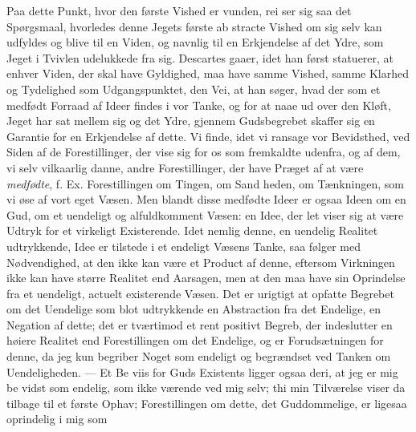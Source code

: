 \documentclass[12pt,a4paper]{book}
\begin{document}
Paa dette Punkt, hvor den første Vished er vunden, rei\-%
ser sig saa det Spørgsmaal, hvorledes denne Jegets første ab\-%
stracte Vished om sig selv kan udfyldes og blive til en Viden,
og navnlig til en Erkjendelse af det Ydre, som Jeget i Tvivlen
udelukkede fra sig. Descartes gaaer, idet han først statuerer,
at enhver Viden, der skal have Gyldighed, maa have samme
Vished, samme Klarhed og Tydelighed som Udgangspunktet,
den Vei, at han søger, hvad der som et medfødt Forraad af
Ideer findes i vor Tanke, og for at naae ud over den Kløft,
Jeget har sat mellem sig og det Ydre, gjennem Gudsbegrebet
skaffer sig en Garantie for en Erkjendelse af dette. Vi finde,
idet vi ransage vor Bevidsthed, ved Siden af de Forestillinger,
der vise sig for os som fremkaldte udenfra, og af dem, vi selv
vilkaarlig danne, andre Forestillinger, der have Præget af at
være \emph{medfødte}, f. Ex. Forestillingen om Tingen, om Sand\-%
heden, om Tænkningen, som vi øse af vort eget Væsen. Men
blandt disse medfødte Ideer er ogsaa Ideen om en Gud, om
et uendeligt og alfuldkomment Væsen: en Idee, der let viser
sig at være Udtryk for et virkeligt Existerende. Idet nemlig
denne, en uendelig Realitet udtrykkende, Idee er tilstede i et
endeligt Væsens Tanke, saa følger med Nødvendighed, at den
ikke kan være et Product af denne, eftersom Virkningen ikke
kan have større Realitet end Aarsagen, men at den maa have
sin Oprindelse fra et uendeligt, actuelt existerende Væsen.
Det er urigtigt at opfatte Begrebet om det Uendelige som blot
udtrykkende en Abstraction fra det Endelige, en Negation af
dette; det er tværtimod et rent positivt Begreb, der indeslutter
en høiere Realitet end Forestillingen om det Endelige, og er
Forudsætningen for denne, da jeg kun begriber Noget som
endeligt og begrændset ved Tanken om Uendeligheden. --- Et Be\-%
viis for Guds Existents ligger ogsaa deri, at jeg er mig be\-%
vidst som endelig, som ikke værende ved mig selv; thi min
Tilværelse viser da tilbage til et første Ophav; Forestillingen
om dette, det Guddommelige, er ligesaa oprindelig i mig som
\end{document}
